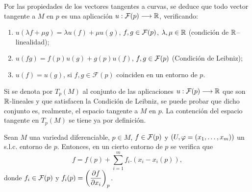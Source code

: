 \documentclass[cursovd_portada.tex]{subfiles}
\begin{document}
\begin{comment}
Siempre existen curvas diferenciables en $M$ que pasan por $p$. Por ejemplo, la curva constante $\a:\R\fl
M:t\mapsto\a(t)=p$, cuyo vector tangente es $\a'(t)=0$, para todo $t\in\R$.
\par
Por otra parte, si $(U,\vp=(x_1,\dots ,x_m))$ es un s.l.c. entorno de $p$, entonces $\vp(p)=(p_1,\dots
,p_m)\in\vp(U)\subseteq\R^m$. Para cada $i=1,\dots ,m$, sea $\epsilon>0$ tal que
$$(p_1,\dots ,p_{i-1},p_i+t,p_{i+1},\dots ,p_m)\in\vp(U),$$
con $\vert t\vert <\epsilon$, que existe ya que $\vp(U)$ es abierto. Entonces
$$\a_i:(-\epsilon,\epsilon)\fl M:t\mapsto\vp^{-1}((p_1,\dots ,p_{i-1},p_i+t,p_{i+1},\dots ,p_m))$$
es una curva diferenciable en $M$, con $\a_i(0)=p$ y $\a_i'(0)$ es, por tanto, un vector tangente a $M$ en $p$,
que se denotará por:
$$\left(\dep{x_i}\right)_p.$$
\hs Esta notación está justificada porque si $f\in\mathcal{F}(p)$, se tiene que
$$(f\circ\a_i)(t)=(f\circ\vp^{-1})((p_1,\dots ,p_{i-1},p_i+t,p_{i+1},\dots ,p_m))=(f\circ\vp^{-1}\circ h_i)(t),$$
donde $h_i:(-\epsilon,\epsilon)\fl\vp(U):t\mapsto h_i(t)=(p_1,\dots ,p_{i-1},p_i+t,p_{i+1},\dots ,p_m)$. Ahora
bien, $h_i(0)=\vp(p)$ y, por la Regla de la Cadena en espacios euclídeos:
$$\a_i'(0)f=\left.\dderi{(f\circ\a_i)}{t}\right|_{t=0}=(\nabla(f\circ\vp^{-1}))_{h_i(0)}.h'_i(0)=$$
$$=\left(\ddep{(f\circ\vp^{-1})}{u_i}\right)_{\vp(p)}= \left(\ddep{f}{x_i}\right)_p.$$
\hs A partir de ahora, se denotará:
$$\left(\dep{x_i}\right)_pf=\left(\ddep{f}{x_i}\right)_p,\mbox{ }i=1,\dots ,m.$$
\end{comment}
\hs Por las propiedades de los vectores tangentes a curvas, se deduce que todo vector tangente a $M$ en $p$ es una
aplicación $u:\mathcal{F}(p)\longrightarrow\mathbb{R}$, verificando:
\begin{enumerate}
\item $u(\lambda f+\mu g)=\lambda u(f)+\mu u(g)$, $f,g\in{\cal F}(p)$, $\lambda,\mu\in\mathbb{R}$ (condición de
$\mathbb{R}$--linealidad);
\item $u(fg)=f(p)u(g)+g(p)u(f)$, $f,g\in{\cal F}(p)$ (Condición de Leibniz);
\item $u(f)=u(g)$, si $f,g\in\mathcal{F}(p)$ coinciden en un entorno de $p$.
\end{enumerate}
\hs Si se denota por $T_p(M)$ al conjunto de las aplicaciones $u:\mathcal{F}(p)\longrightarrow\mathbb{R}$ que son $\mathbb{R}$-lineales y que
satisfacen la Condición de Leibniz, se puede probar que dicho conjunto es, realmente, el espacio tangente a $M$
en $p$. La contención del espacio tangente en $T_p(M)$ se tiene ya por definición.
\begin{lemma}
Sean $M$ una variedad diferenciable, $p\in M$, $f\in{\cal F}(p)$ y $(U,\varphi=(x_1,\dots ,x_m))$ un s.l.c. entorno de
$p$. Entonces, en un cierto entorno de $p$ se verifica que
$$f=f(p)+\sum_{i=1}^mf_i.(x_i-x_i(p)),$$
donde $f_i\in{\cal F}(p)$ y $f_i(p)=\left(\displaystyle{\frac{\partial f}{\partial x_i}}\right)_p$.
\end{lemma}
\end{document}
